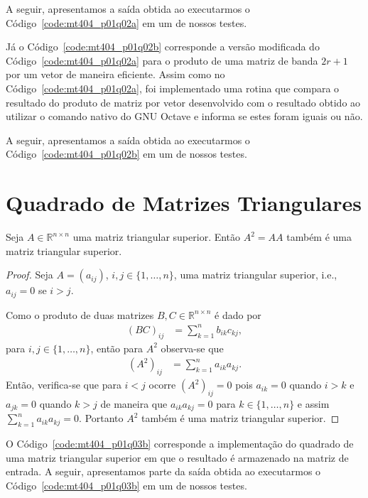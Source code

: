 \documentclass[12pt,a4paper]{article}
\begin{document}
A seguir, apresentamos a saída obtida ao executarmos o Código~\ref{code:mt404_p01q02a} em um de nossos testes.


Já o Código~\ref{code:mt404_p01q02b} corresponde a versão modificada do Código~\ref{code:mt404_p01q02a} para o produto de uma matriz de banda $2r + 1$ por um vetor de maneira eficiente. Assim como no  Código~\ref{code:mt404_p01q02a}, foi implementado uma rotina que compara o resultado do produto de matriz por vetor desenvolvido com o resultado obtido ao utilizar o comando nativo do GNU Octave e informa se estes foram iguais ou não.

A seguir, apresentamos a saída obtida ao executarmos o Código~\ref{code:mt404_p01q02b} em um de nossos testes.


\section{Quadrado de Matrizes Triangulares}
\begin{prop}
    Seja $A \in \mathbb{R}^{n \times n}$ uma matriz triangular superior. Então $A^2 = A A$ também é uma matriz triangular superior.
\end{prop}
\begin{proof}
    Seja $A = (a_{ij})$, $i, j \in \{1, \ldots, n\}$, uma matriz triangular superior, i.e., $a_{ij} = 0$ se $i > j$.
    
    Como o produto de duas matrizes $B, C \in \mathbb{R}^{n \times n}$ é dado por
    \begin{align*}
        (B C)_{ij} &= \sum_{k = 1}^n b_{ik} c_{kj},
    \end{align*}
    para $i,j \in \{1, \ldots, n\}$, então para $A^2$ observa-se que
    \begin{align*}
        (A^2)_{ij} &= \sum_{k = 1}^n a_{ik} a_{kj}.
    \end{align*}
    Então, verifica-se que para $i < j$ ocorre $(A^2)_{ij} = 0$ pois $a_{ik} = 0$ quando $i > k$ e $a_{jk} = 0$ quando $k > j$ de maneira que $a_{ik} a_{kj} = 0$ para $k \in \{1, \ldots, n\}$ e assim $\sum_{k = 1}^n a_{ik} a_{kj} = 0$. Portanto $A^2$ também é uma matriz triangular superior.
\end{proof}

O Código~\ref{code:mt404_p01q03b} corresponde a implementação do quadrado de uma matriz triangular superior em que o resultado é armazenado na matriz de entrada. A seguir, apresentamos parte da saída obtida ao executarmos o Código~\ref{code:mt404_p01q03b} em um de nossos testes.

\end{document}
